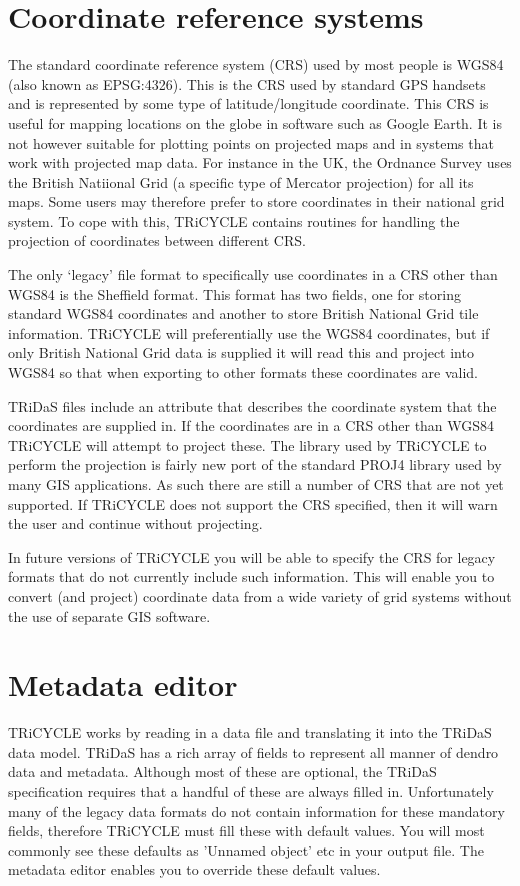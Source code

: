 \documentclass[10pt, headsepline,DIV14,BCOR0.5cm]{scrreprt}
\begin{document}
\section{Coordinate reference systems}
The standard coordinate reference system (CRS) used by most people is WGS84 (also known as EPSG:4326).  This is the CRS used by standard GPS handsets and is represented by some type of latitude/longitude coordinate.  This CRS is useful for mapping locations on the globe in software such as Google Earth.  It is not however suitable for plotting points on projected maps and in systems that work with projected map data.  For instance in the UK, the Ordnance Survey uses the British Natiional Grid (a specific type of Mercator projection) for all its maps.  Some users may therefore prefer to store coordinates in their national grid system.  To cope with this, TRiCYCLE contains routines for handling the projection of coordinates between different CRS.

The only `legacy' file format to specifically use coordinates in a CRS other than WGS84 is the Sheffield format.  This format has two fields, one for storing standard WGS84 coordinates and another to store British National Grid tile information.  TRiCYCLE will preferentially use the WGS84 coordinates, but if only British National Grid data is supplied it will read this and project into WGS84 so that when exporting to other formats these coordinates are valid.

TRiDaS files include an attribute that describes the coordinate system that the coordinates are supplied in.  If the coordinates are in a CRS other than WGS84 TRiCYCLE will attempt to project these.  The library used by TRiCYCLE to perform the projection is fairly new port of the standard PROJ4 library used by many GIS applications.  As such there are still a number of CRS that are not yet supported.  If TRiCYCLE does not support the CRS specified, then it will warn the user and continue without projecting.

In future versions of TRiCYCLE you will be able to specify the CRS for legacy formats that do not currently include such information.  This will enable you to convert (and project) coordinate data from a wide variety of grid systems without the use of separate GIS software.

\section{Metadata editor}

TRiCYCLE works by reading in a data file and translating it into the TRiDaS data model. TRiDaS has
a rich array of fields to represent all manner of dendro data and metadata. Although most of these are
optional, the TRiDaS specification requires that a handful of these are always filled in. Unfortunately many
of the legacy data formats do not contain information for these mandatory fields, therefore TRiCYCLE
must fill these with default values. You will most commonly see these defaults as 'Unnamed object' etc in
your output file. The metadata editor enables you to override these default values.
\end{document}
